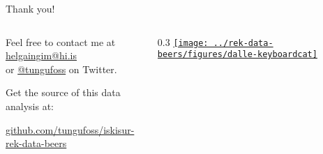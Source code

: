 \begin{frame}{Thank you!}
    \begin{columns}[T]

        \begin{column}{0.6\textwidth}
            Feel free to contact me at \href{mailto:helgaingim@hi.is}{helgaingim@hi.is} \\
            or \href{https://twitter.com/tungufoss}{@tungufoss} on Twitter.

            \vspace{12pt}

            Get the source of this data analysis at:
            \begin{center}
                \url{github.com/tungufoss/iskisur-rek-data-beers}

                \vspace{6pt}

                \ccbysa
            \end{center}
        \end{column}
        \begin{column} {0.3\textwidth}
            \href{https://www.youtube.com/watch?v=DK7CVqbtW0A}{
                \texttt{[image: ../rek-data-beers/figures/dalle-keyboardcat]}
            }
        \end{column}
    \end{columns}
\end{frame}